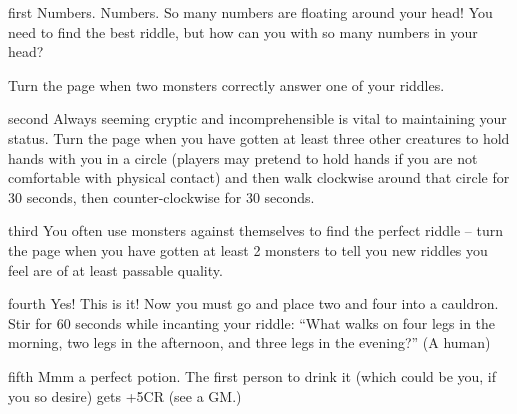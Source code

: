 \documentclass[notebook]{guildcamp2} %
\begin{document}
\startnotebook{\nriddletastic{}}

\begin{page}{first}
Numbers. Numbers. So many numbers are floating around your head! You need to find the best riddle, but how can you with so many numbers in your head?

Turn the page when two monsters correctly answer one of your riddles.
\end{page}

\begin{page}{second}
Always seeming cryptic and incomprehensible is vital to maintaining your status. Turn the page when you have gotten at least three other creatures to hold hands with you in a circle (players may pretend to hold hands if you are not comfortable with physical contact) and then walk clockwise around that circle for 30 seconds, then counter-clockwise for 30 seconds.
\end{page}

\begin{page}{third}
You often use monsters against themselves to find the perfect riddle -- turn the page when you have gotten at least 2 monsters to tell you new riddles you feel are of at least passable quality.
\end{page}

\begin{page}{fourth}
Yes! This is it! Now you must go and place two \iBilberries{} and four \iEyebright{} into a cauldron. Stir for 60 seconds while incanting your riddle: ``What walks on four legs in the morning, two legs in the afternoon, and three legs in the evening?'' (A human)

\end{page}

\begin{page}{fifth}
Mmm a perfect potion. The first person to drink it (which could be you, if you so desire) gets +5CR (see a GM.)
\end{page}


\endnotebook
\end{document}
